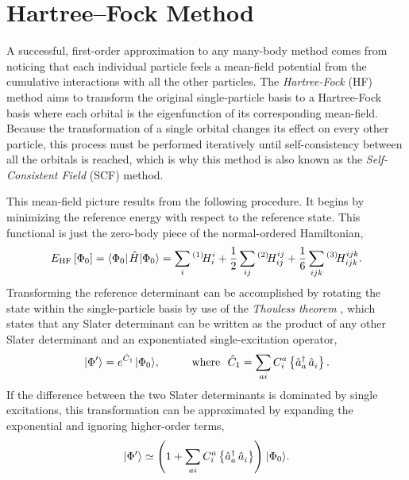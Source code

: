 \documentclass[thesis.tex]{subfiles}
\begin{document}
\section{Hartree--Fock Method} \label{section:hartree-fock}
A successful, first-order approximation to any many-body method comes from noticing that each individual particle feels a mean-field potential from the cumulative interactions with all the other particles.  The \textit{Hartree-Fock} (HF) method \cite{HARTREE1928,FOCK1930} aims to transform the original single-particle basis to a Hartree-Fock basis where each orbital is the eigenfunction of its corresponding mean-field.  Because the transformation of a single orbital changes its effect on every other particle, this process must be performed iteratively until self-consistency between all the orbitals is reached, which is why this method is also known as the \textit{Self-Consistent Field} (SCF) method.

This mean-field picture results from the following procedure.  It begins by minimizing the reference energy with respect to the reference state.  This functional is just the zero-body piece of the normal-ordered Hamiltonian,
\begin{equation}
  E_{\text{HF}}\left[ \Ref \right] = \element{\Ref}{\Ham}{\Ref} = \sum_{\mathclap{i}}\Hint{1}{i}{i} + \frac{1}{2}\sum_{\mathclap{ij}}\Hint{2}{ij}{ij} + \frac{1}{6}\sum_{\mathclap{ijk}}\Hint{3}{ijk}{ijk}.
\end{equation}
Transforming the reference determinant can be accomplished by rotating the state within the single-particle basis by use of the \textit{Thouless theorem} \cite{THOULESS1960225}, which states that any Slater determinant can be written as the product of any other Slater determinant and an exponentiated single-excitation operator,
\begin{equation} \label{eq:thouless}
  \hspace{1pt}\lvert \Phi' \rangle = e^{\hat{C}_{1}}\hspace{1pt}\lvert \Phi_{0} \rangle, \hspace{1cm} \text{where\ \ } \hat{C}_{1} = \sum_{a i}C^{a}_{i}\left\{ \mathop{\hat{a}^{\dagger}_{a}}\mathop{\hat{a}^{}_{i}} \right\}.
\end{equation}
If the difference between the two Slater determinants is dominated by single excitations, this transformation can be approximated by expanding the exponential and ignoring higher-order terms,
\begin{equation} \label{eq:thouless_limit}
  \hspace{1pt}\lvert \Phi' \rangle \simeq \left( 1 + \sum_{a i}C^{a}_{i}\left\{ \mathop{\hat{a}^{\dagger}_{a}}\mathop{\hat{a}^{}_{i}} \right\} \right)\hspace{1pt}\lvert \Phi_{0} \rangle.
\end{equation}
\end{document}
